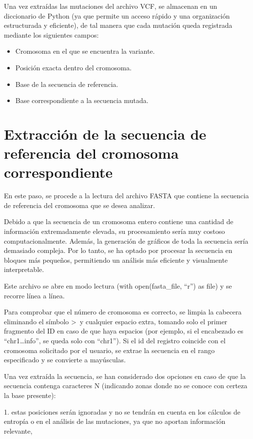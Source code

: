 \documentclass[11pt,spanish,listoffigures,listoftables]{tfgetsinf}
\begin{document}
Una vez extraídas las mutaciones del archivo VCF, se almacenan en un diccionario de Python (ya que permite un acceso rápido y una organización estructurada y eficiente), de tal manera que cada mutación queda registrada mediante los siguientes campos: 

\begin{itemize}
   \item Cromosoma en el que se encuentra la variante.
   \item Posición exacta dentro del cromosoma.
   \item Base de la secuencia de referencia.
   \item Base correspondiente a la secuencia mutada.
\end{itemize}

\section{Extracción de la secuencia de referencia del cromosoma correspondiente}

En este paso, se procede a la lectura del archivo FASTA que contiene la secuencia de referencia del cromosoma que se desea analizar.  

Debido a que la secuencia de un cromosoma entero contiene una cantidad de información extremadamente elevada, su procesamiento sería muy costoso computacionalmente. Además, la generación de gráficos de toda la secuencia sería demasiado compleja. Por lo tanto, se ha optado por procesar la secuencia en bloques más pequeños, permitiendo un análisis más eficiente y visualmente interpretable. 

Este archivo se abre en modo lectura (with open(fasta\_file, ``r'') as file) y se recorre línea a línea.

Para comprobar que el número de cromosoma es correcto, se limpia la cabecera eliminando el símbolo >\ y cualquier espacio extra, tomando solo el primer fragmento del ID en caso de que haya espacios (por ejemplo, si el encabezado es ``chr1\dots info'', se queda solo con ``chr1''). Si el id del registro coincide con el cromosoma solicitado por el usuario, se extrae la secuencia en el rango especificado y se convierte a mayúsculas. 

Una vez extraída la secuencia, se han considerado dos opciones en caso de que la secuencia contenga caracteres N (indicando zonas donde no se conoce con certeza la base presente): 

1. estas posiciones serán ignoradas y no se tendrán en cuenta en los cálculos de entropía o en el análisis de las mutaciones, ya que no aportan información relevante, 
\end{document}
